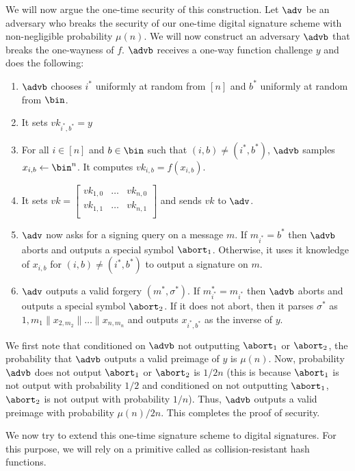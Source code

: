 We will now argue the one-time security of this construction. Let $\adv$ be an adversary who breaks the security of our one-time digital signature scheme with non-negligible probability $\mu(n)$. We will now construct an adversary $\advb$ that breaks the one-wayness of $f$. $\advb$ receives a one-way function challenge $y$ and does the following:
\begin{enumerate}
    \item $\advb$ chooses $i^*$ uniformly at random from $[n]$ and $b^*$ uniformly at random from $\bin$.
    \item It sets $vk_{i^*,b^*} = y$
    \item For all $i \in [n]$ and $b \in \bin$ such that $(i,b) \neq (i^*,b^*)$, $\advb$ samples $x_{i,b} \gets \bin^n$. It computes $vk_{i,b} = f(x_{i,b})$.
    \item It sets $vk = \left[ \begin{array}{ccc}
vk_{1,0} & \ldots& vk_{n,0} \\
vk_{1,1} & \ldots& vk_{n,1} \\
\end{array} \right]$ and sends $vk$ to $\adv$.
\item $\adv$ now asks for a signing query on a message $m$. If $m_{i^*} = b^*$ then $\advb$ aborts and outputs a special symbol $\abort_1$. Otherwise, it uses it knowledge of $x_{i,b}$ for $(i,b) \neq (i^*,b^*)$ to output a signature on $m$.
\item $\adv$ outputs a valid forgery $(m^*,\sigma^*)$. If $m^*_{i^*} = m_{i^*}$ then $\advb$ aborts and outputs a special symbol $\abort_2$. If it does not abort, then it parses $\sigma^*$ as ${1,m_1}\|x_{2,m_2}\| \ldots \| x_{n,m_n}$ and outputs $x_{i^*,b^*}$ as the inverse of $y$.
\end{enumerate}
We first note that conditioned on $\advb$ not outputting $\abort_1$ or $\abort_2$, the probability that $\advb$ outputs a valid preimage of $y$ is $\mu(n)$. Now, probability $\advb$ does not output $\abort_1$ or $\abort_2$ is $1/2n$ (this is because $\abort_1$ is not output with probability $1/2$ and conditioned on not outputting $\abort_1$, $\abort_2$ is not output with probability $1/n$). Thus, $\advb$ outputs a valid preimage with probability $\mu(n)/2n$. This completes the proof of security.

We now try to extend this one-time signature scheme to digital signatures. For this purpose, we will rely on a primitive called as collision-resistant hash functions.
\DIFaddbegin 

